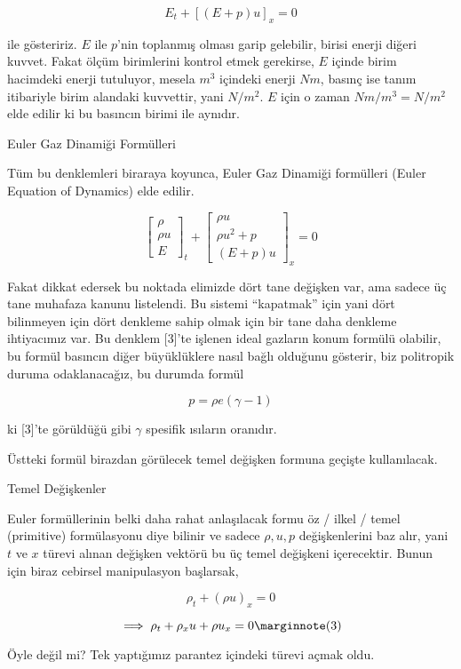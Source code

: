 \documentclass[12pt,fleqn]{article}\usepackage{../../common}
\begin{document}
$$
E_t + [(E + p) u ]_x = 0
$$

ile gösteririz. $E$ ile $p$'nin toplanmış olması garip gelebilir, birisi enerji
diğeri kuvvet. Fakat ölçüm birimlerini kontrol etmek gerekirse, $E$ içinde birim
hacimdeki enerji tutuluyor, mesela $m^3$ içindeki enerji $N m$, basınç ise tanım
itibariyle birim alandaki kuvvettir, yani $N / m^2$. $E$ için o zaman
$N m / m^3 = N / m^2$ elde edilir ki bu basıncın birimi ile aynıdır.

Euler Gaz Dinamiği Formülleri

Tüm bu denklemleri biraraya koyunca, Euler Gaz Dinamiği formülleri (Euler
Equation of Dynamics) elde edilir.

$$
\left[\begin{array}{c}
\rho \\ \rho u  \\ E
\end{array}\right]_t
+
\left[\begin{array}{c}
\rho u \\ \rho u^2 + p \\ (E+p) u 
\end{array}\right]_x 
= 0
$$

Fakat dikkat edersek bu noktada elimizde dört tane değişken var, ama sadece üç
tane muhafaza kanunu listelendi. Bu sistemi ``kapatmak'' için yani dört
bilinmeyen için dört denkleme sahip olmak için bir tane daha denkleme
ihtiyacımız var. Bu denklem [3]'te işlenen ideal gazların konum formülü
olabilir, bu formül basıncın diğer büyüklüklere nasıl bağlı olduğunu
gösterir, biz politropik duruma odaklanacağız, bu durumda formül

$$
p = \rho e (\gamma - 1)
$$

ki [3]'te görüldüğü gibi $\gamma$ spesifik ısıların oranıdır.

Üstteki formül birazdan görülecek temel değişken formuna geçişte kullanılacak.

Temel Değişkenler

Euler formüllerinin belki daha rahat anlaşılacak formu öz / ilkel / temel
(primitive) formülasyonu diye bilinir ve sadece $\rho,u,p$ değişkenlerini baz
alır, yani $t$ ve $x$ türevi alınan değişken vektörü bu üç temel değişkeni
içerecektir. Bunun için biraz cebirsel manipulasyon
başlarsak,

$$
\rho_t + (\rho u)_x = 0 
$$

$$
\implies \rho_t + \rho_x u + \rho u_x = 0
\mlabel{3}
$$

Öyle değil mi? Tek yaptığımız parantez içindeki türevi açmak oldu. 
\end{document}
